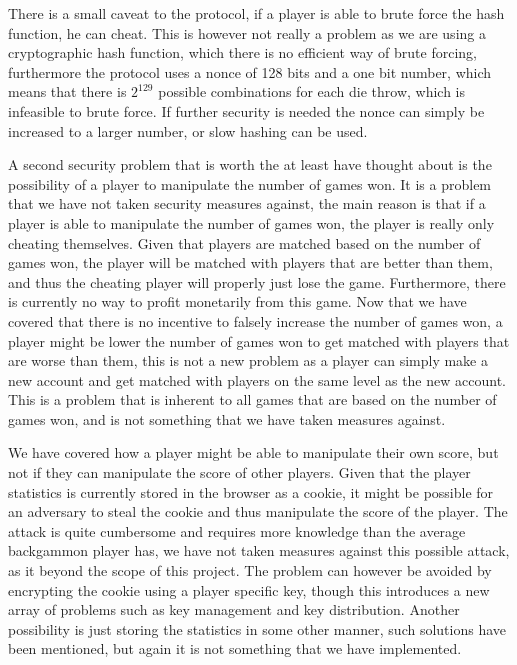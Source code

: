 \documentclass[ twoside,openright,titlepage,numbers=noenddot,headinclude,%
                footinclude=true,cleardoublepage=empty,abstractoff, %
                BCOR=5mm,paper=a4,fontsize=11pt,%
                ngerman,american,%
                ]{scrreprt}
\begin{document}
There is a small caveat to the protocol, if a player is able to brute force the hash function, he can cheat. This is however not really a problem as we are using a cryptographic hash function, which there is no efficient way of brute forcing, furthermore the protocol uses a nonce of 128 bits and a one bit number, which means that there is $2^{129}$ possible combinations for each die throw, which is infeasible to brute force. If further security is needed the nonce can simply be increased to a larger number, or slow hashing can be used.

A second security problem that is worth the at least have thought about is the possibility of a player to manipulate the number of games won. It is a problem that we have not taken security measures against, the main reason is that if a player is able to manipulate the number of games won, the player is really only cheating themselves. Given that players are matched based on the number of games won, the player will be matched with players that are better than them, and thus the cheating player will properly just lose the game. Furthermore, there is currently no way to profit monetarily from this game. Now that we have covered that there is no incentive to falsely increase the number of games won, a player might be lower the number of games won to get matched with players that are worse than them, this is not a new problem as a player can simply make a new account and get matched with players on the same level as the new account. This is a problem that is inherent to all games that are based on the number of games won, and is not something that we have taken measures against.

We have covered how a player might be able to manipulate their own score, but not if they can manipulate the score of other players. Given that the player statistics is currently stored in the browser as a cookie, it might be possible for an adversary to steal the cookie and thus manipulate the score of the player. The attack is quite cumbersome and requires more knowledge than the average backgammon player has, we have not taken measures against this possible attack, as it beyond the scope of this project. The problem can however be avoided by encrypting the cookie using a player specific key, though this introduces a new array of problems such as key management and key distribution. Another possibility is just storing the statistics in some other manner, such solutions have been mentioned, but again it is not something that we have implemented.
\end{document}
